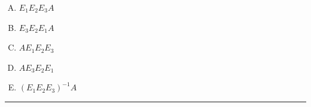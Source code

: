 \documentclass[12pt]{amsart}
\newcommand{\divider}{
  \vspace{-1em} %
  \noindent
  \raisebox{-0.15ex}{\textbullet}%
  \hspace{0.5em}%
  \rule[0.5ex]{0.95\textwidth}{1.0pt}%
  \hspace{0.5em}%
  \raisebox{-0.15ex}{\textbullet}%
  \vspace{0em} %
}
\begin{document}
\begin{enumerate}[(A)]
\item $E_1 E_2 E_3 A$
\item $E_3 E_2 E_1 A$
\item $A E_1 E_2 E_3$
\item $A E_3 E_2 E_1$
\item $(E_1 E_2 E_3)^{-1} A$
\end{enumerate}


\divider
\end{document}
